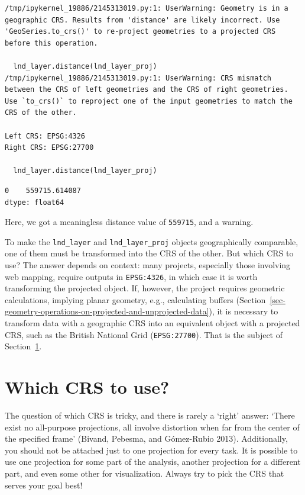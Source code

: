 \documentclass[
  letterpaper,
]{krantz}
\begin{document}
\begin{verbatim}
/tmp/ipykernel_19886/2145313019.py:1: UserWarning: Geometry is in a geographic CRS. Results from 'distance' are likely incorrect. Use 'GeoSeries.to_crs()' to re-project geometries to a projected CRS before this operation.

  lnd_layer.distance(lnd_layer_proj)
/tmp/ipykernel_19886/2145313019.py:1: UserWarning: CRS mismatch between the CRS of left geometries and the CRS of right geometries.
Use `to_crs()` to reproject one of the input geometries to match the CRS of the other.

Left CRS: EPSG:4326
Right CRS: EPSG:27700

  lnd_layer.distance(lnd_layer_proj)
\end{verbatim}

\begin{verbatim}
0    559715.614087
dtype: float64
\end{verbatim}

Here, we got a meaningless distance value of \texttt{559715}, and a
warning.

To make the \texttt{lnd\_layer} and \texttt{lnd\_layer\_proj} objects
geographically comparable, one of them must be transformed into the CRS
of the other. But which CRS to use? The answer depends on context: many
projects, especially those involving web mapping, require outputs in
\texttt{EPSG:4326}, in which case it is worth transforming the projected
object. If, however, the project requires geometric calculations,
implying planar geometry, e.g., calculating buffers
(Section~\ref{sec-geometry-operations-on-projected-and-unprojected-data}),
it is necessary to transform data with a geographic CRS into an
equivalent object with a projected CRS, such as the British National
Grid (\texttt{EPSG:27700}). That is the subject of
Section~\ref{sec-which-crs-to-use}.

\section{Which CRS to use?}\label{sec-which-crs-to-use}

The question of which CRS is tricky, and there is rarely a `right'
answer: `There exist no all-purpose projections, all involve distortion
when far from the center of the specified frame' (Bivand, Pebesma, and
Gómez-Rubio 2013). Additionally, you should not be attached just to one
projection for every task. It is possible to use one projection for some
part of the analysis, another projection for a different part, and even
some other for visualization. Always try to pick the CRS that serves
your goal best!
\end{document}
